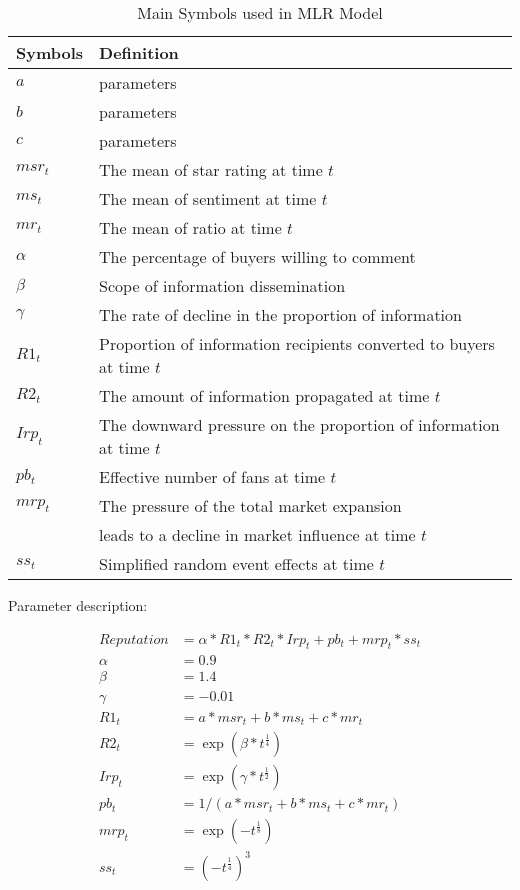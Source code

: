 \documentclass{mcmthesis}
\begin{document}
\begin{table}[!h]
  \centering
  \caption{Main Symbols used in MLR Model} %
  \begin{tabular}{ll}
  \toprule[2.5pt]
  \textbf{Symbols}& \textbf{Definition} \\
  \midrule[1.5pt]
   $a$ &  parameters  \\
   \midrule
   $b$ & parameters \\
   \midrule
   $c$ & parameters \\
   \midrule
   $msr_t$ & The mean of star rating at time $t$ \\
   \midrule
   $ms_t$ & The mean of sentiment at time $t$ \\
   \midrule
   $mr_t$ & The mean of ratio at time $t$ \\
   \midrule 
   $\alpha$ & The percentage of buyers willing to comment \\
   \midrule 
   $\beta$ & Scope of information dissemination \\
   \midrule 
   $\gamma$ &  The rate of decline in the proportion of information \\
    \midrule
    $R1_t$ & Proportion of information recipients converted to buyers at time $t$ \\
    \midrule 
    $R2_t$ & The amount of information propagated at time $t$ \\
    \midrule 
    $Irp_t$ & The downward pressure on the proportion of information at time $t$  \\
    \midrule  
    $pb_t$ &  Effective number of fans at time $t$  \\
    \midrule 
    $mrp_t$ & The pressure of the total market expansion \\
    & leads to a decline in market influence at time $t$ \\
    \midrule 
    $ss_t$ & Simplified random event effects at time $t$ \\
  \bottomrule
  \end{tabular}
  \end{table}


Parameter description:

\begin{equation}
  \begin{aligned}
    Reputation & = \alpha * R1_t * R2_t * Irp_t + pb_t + mrp_t *ss_t \\
    \alpha &= 0.9 \\
    \beta & = 1.4 \\
    \gamma & = -0.01 \\
    R1_t &= a*msr_t + b*ms_t + c*mr_t \\
    R2_t & = \exp{(\beta * t^{\frac{1}{4}})} \\
    Irp_t & = \exp{(\gamma * t^{\frac{1}{2}})} \\
    pb_t & = 1 / (a*msr_t + b*ms_t + c* mr_t) \\
    mrp_t &= \exp{(-t^{\frac{1}{8}})} \\
    ss_t &= (-t^{\frac{1}{4}})^3 \\
  \end{aligned}
\end{equation}
\end{document}
